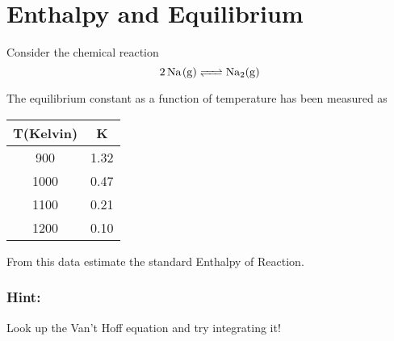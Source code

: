 \documentclass{article}
\newcommand{\be}{\begin{equation}}
\newcommand{\ee}{\end{equation}}
\begin{document}
\section{Enthalpy and Equilibrium}
Consider the chemical reaction
\be
\ce{2 Na(g) <=> Na2(g)}
\ee

The equilibrium constant as a function of temperature has been measured as

\begin{center}
 \begin{tabular}{|c | c |} 
 \hline
 T(Kelvin) & K   \\ 
 \hline
 900 & 1.32   \\
 \hline
 1000 & 0.47  \\
 \hline
 1100 & 0.21  \\
 \hline
 1200 & 0.10   \\  
 \hline
\end{tabular}
\end{center}

From this data estimate the standard Enthalpy of Reaction. 

\subsubsection*{Hint:}
Look up the Van't Hoff equation and try integrating it!
\end{document}

